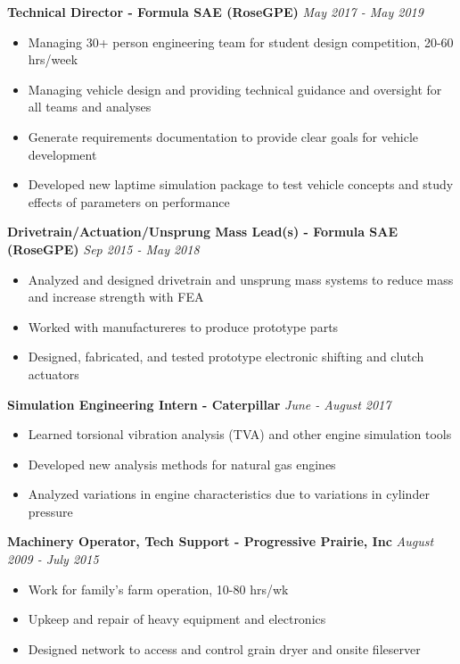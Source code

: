 \documentclass[9pt]{article}
\begin{document}
{\bf Technical Director - Formula SAE (RoseGPE)} \hfill {\sl May 2017 - May 2019} \\
   \vspace{-6pt} \begin{itemize} \itemsep -2pt %
   \item Managing 30+ person engineering team for student design competition, 20-60 hrs/week
   \item Managing vehicle design and providing technical guidance and oversight for all teams and analyses
   \item Generate requirements documentation to provide clear goals for vehicle development
   \item Developed new laptime simulation package to test vehicle concepts and study effects of parameters on performance
 \end{itemize}
 
{\bf Drivetrain/Actuation/Unsprung Mass Lead(s) - Formula SAE (RoseGPE)} \hfill {\sl Sep 2015 - May 2018} \\
   \vspace{-6pt} \begin{itemize} \itemsep -2pt %
   \item Analyzed and designed drivetrain and unsprung mass systems to reduce mass and increase strength with FEA
   \item Worked with manufactureres to produce prototype parts
   \item Designed, fabricated, and tested prototype electronic shifting and clutch actuators
 \end{itemize}
 
{\bf Simulation Engineering Intern - Caterpillar} \hfill {\sl  June - August 2017} \\
   \vspace{-6pt} \begin{itemize} \itemsep -2pt %
   \item Learned torsional vibration analysis (TVA) and other engine simulation tools
   \item Developed new analysis methods for natural gas engines
   \item Analyzed variations in engine characteristics due to variations in cylinder pressure
 \end{itemize}

{\bf Machinery Operator, Tech Support - Progressive Prairie, Inc} \hfill       {\sl  August 2009 - July 2015 }\\
   \vspace{-6pt} \begin{itemize} \itemsep -2pt %
   \item Work for family's farm operation, 10-80 hrs/wk
   \item Upkeep and repair of heavy equipment and electronics
   \item Designed network to access and control grain dryer and onsite fileserver
 \end{itemize}
\end{document}
